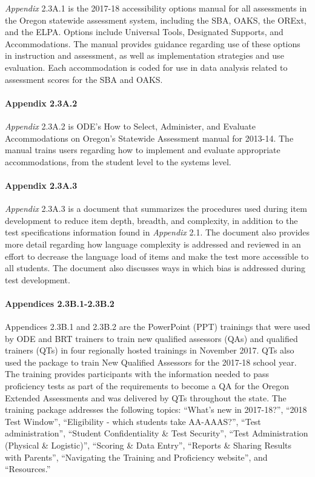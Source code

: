 \documentclass[]{article}
\let\oldparagraph\paragraph
\renewcommand{\paragraph}[1]{\oldparagraph{#1}\mbox{}}
\begin{document}
\emph{Appendix} 2.3A.1 is the 2017-18 accessibility options manual for
all assessments in the Oregon statewide assessment system, including the
SBA, OAKS, the ORExt, and the ELPA. Options include Universal Tools,
Designated Supports, and Accommodations. The manual provides guidance
regarding use of these options in instruction and assessment, as well as
implementation strategies and use evaluation. Each accommodation is
coded for use in data analysis related to assessment scores for the SBA
and OAKS.

\paragraph{Appendix 2.3A.2}\label{appendix-2.3a.2}

\emph{Appendix} 2.3A.2 is ODE's How to Select, Administer, and Evaluate
Accommodations on Oregon's Statewide Assessment manual for 2013-14. The
manual trains users regarding how to implement and evaluate appropriate
accommodations, from the student level to the systems level.

\paragraph{Appendix 2.3A.3}\label{appendix-2.3a.3}

\emph{Appendix} 2.3A.3 is a document that summarizes the procedures used
during item development to reduce item depth, breadth, and complexity,
in addition to the test specifications information found in
\emph{Appendix} 2.1. The document also provides more detail regarding
how language complexity is addressed and reviewed in an effort to
decrease the language load of items and make the test more accessible to
all students. The document also discusses ways in which bias is
addressed during test development.

\paragraph{Appendices 2.3B.1-2.3B.2}\label{appendices-2.3b.1-2.3b.2}

Appendices 2.3B.1 and 2.3B.2 are the PowerPoint (PPT) trainings that
were used by ODE and BRT trainers to train new qualified assessors (QAs)
and qualified trainers (QTs) in four regionally hosted trainings in
November 2017. QTs also used the package to train New Qualified
Assessors for the 2017-18 school year. The training provides
participants with the information needed to pass proficiency tests as
part of the requirements to become a QA for the Oregon Extended
Assessments and was delivered by QTs throughout the state. The training
package addresses the following topics: ``What's new in 2017-18?'',
``2018 Test Window'', ``Eligibility - which students take AA-AAAS?'',
``Test administration'', ``Student Confidentiality \& Test Security'',
``Test Administration (Physical \& Logistic)'', ``Scoring \& Data
Entry'', ``Reports \& Sharing Results with Parents'', ``Navigating the
Training and Proficiency website'', and ``Resources.''
\end{document}
